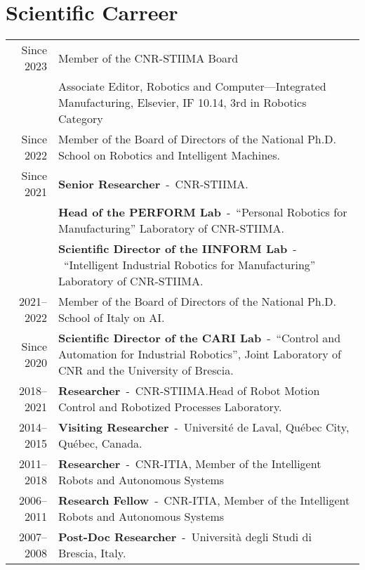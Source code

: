 \documentclass[a4paper,9pt]{extarticle}
\begin{document}
\section*{Scientific Carreer}
\begin{tabularx}{\textwidth}{rX}
   Since 2023 & Member of the CNR-STIIMA Board\\
              & Associate Editor, Robotics and Computer---Integrated Manufacturing, Elsevier, IF 10.14, 3rd in Robotics Category\\
   Since 2022 & Member of the Board of Directors of the National Ph.D. School on Robotics and Intelligent Machines.\\
   Since 2021 & \textbf{Senior Researcher}~-~CNR-STIIMA.\\
              & \textbf{Head of the PERFORM Lab}~-~``Personal Robotics for Manufacturing'' Laboratory of CNR-STIIMA.\\
              & \textbf{Scientific Director of the IINFORM Lab}~-~``Intelligent Industrial Robotics for Manufacturing'' Laboratory of CNR-STIIMA.\\
   2021--2022 & Member of the Board of Directors of the National Ph.D. School of Italy on AI.\\
   Since 2020 & \textbf{Scientific Director of the CARI Lab}~-~``Control and Automation for Industrial Robotics'', Joint Laboratory of CNR and the University of Brescia.\\
   2018--2021 & \textbf{Researcher}~-~CNR-STIIMA.\@ Head of Robot Motion Control and Robotized Processes Laboratory.\\
   2014--2015 & \textbf{Visiting Researcher}~-~Université de Laval, Québec City, Québec, Canada.\\
   2011--2018 & \textbf{Researcher}~-~CNR-ITIA, Member of the Intelligent Robots and Autonomous Systems\\
   2006--2011 & \textbf{Research Fellow}~-~CNR-ITIA, Member of the Intelligent Robots and Autonomous Systems\\
   2007--2008 & \textbf{Post-Doc Researcher}~-~Università degli Studi di Brescia, Italy.\\
\end{tabularx}
   
\end{document}
